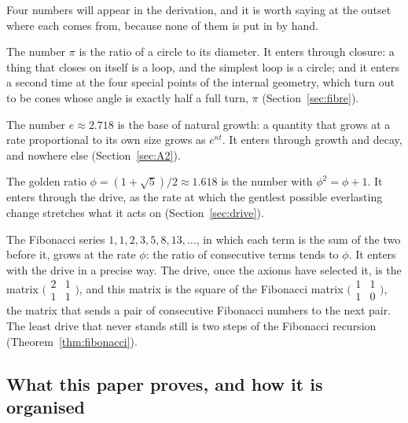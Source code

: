 \documentclass[11pt,a4paper]{article}
\theoremstyle{plain}
\theoremstyle{definition}
\theoremstyle{remark}
\begin{document}
Four numbers will appear in the derivation, and it is worth saying at the outset where each comes from, because none of them is put in by hand.

The number $\pi$ is the ratio of a circle to its diameter. It enters through closure: a thing that closes on itself is a loop, and the simplest loop is a circle; and it enters a second time at the four special points of the internal geometry, which turn out to be cones whose angle is exactly half a full turn, $\pi$ (Section~\ref{sec:fibre}).

The number $e\approx2.718$ is the base of natural growth: a quantity that grows at a rate proportional to its own size grows as $e^{\kappa t}$. It enters through growth and decay, and nowhere else (Section~\ref{sec:A2}).

The golden ratio $\phi=(1+\sqrt5)/2\approx1.618$ is the number with $\phi^{2}=\phi+1$. It enters through the drive, as the rate at which the gentlest possible everlasting change stretches what it acts on (Section~\ref{sec:drive}).

The Fibonacci series $1,1,2,3,5,8,13,\dots$, in which each term is the sum of the two before it, grows at the rate $\phi$: the ratio of consecutive terms tends to $\phi$. It enters with the drive in a precise way. The drive, once the axioms have selected it, is the matrix $\bigl(\begin{smallmatrix}2&1\\1&1\end{smallmatrix}\bigr)$, and this matrix is the square of the Fibonacci matrix $\bigl(\begin{smallmatrix}1&1\\1&0\end{smallmatrix}\bigr)$, the matrix that sends a pair of consecutive Fibonacci numbers to the next pair. The least drive that never stands still is two steps of the Fibonacci recursion (Theorem~\ref{thm:fibonacci}).

\subsection{What this paper proves, and how it is organised}\label{sec:results}
\end{document}
